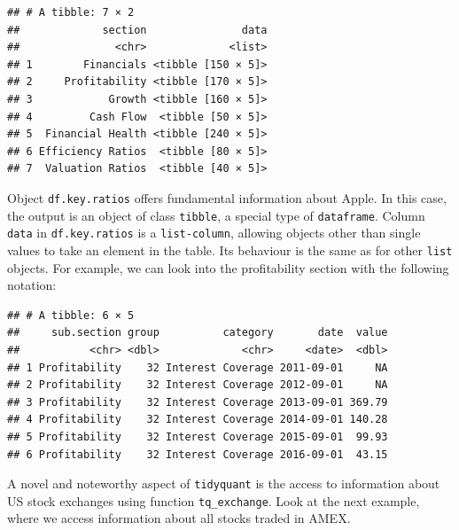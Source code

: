 \documentclass[11pt,]{book}
\newenvironment{Shaded}{\begin{snugshade}}{\end{snugshade}}
\newcommand{\KeywordTok}[1]{\textcolor[rgb]{0.27,0.27,0.27}{\textbf{#1}}}
\newcommand{\DecValTok}[1]{\textcolor[rgb]{0.06,0.06,0.06}{#1}}
\newcommand{\StringTok}[1]{\textcolor[rgb]{0.5,0.5,0.5}{#1}}
\newcommand{\CommentTok}[1]{\textcolor[rgb]{0.56,0.35,0.01}{\textit{#1}}}
\newcommand{\OperatorTok}[1]{\textcolor[rgb]{0.81,0.36,0.00}{\textbf{#1}}}
\newcommand{\NormalTok}[1]{#1}
\begin{document}
\begin{verbatim}
## # A tibble: 7 × 2
##             section               data
##               <chr>             <list>
## 1        Financials <tibble [150 × 5]>
## 2     Profitability <tibble [170 × 5]>
## 3            Growth <tibble [160 × 5]>
## 4         Cash Flow  <tibble [50 × 5]>
## 5  Financial Health <tibble [240 × 5]>
## 6 Efficiency Ratios  <tibble [80 × 5]>
## 7  Valuation Ratios  <tibble [40 × 5]>
\end{verbatim}

Object \texttt{df.key.ratios} offers fundamental information about
Apple. In this case, the output is an object of class \texttt{tibble}, a
special type of \texttt{dataframe}. Column \texttt{data} in
\texttt{df.key.ratios} is a \texttt{list-column}, allowing objects other
than single values to take an element in the table. Its behaviour is the
same as for other \texttt{list} objects. For example, we can look into
the profitability section with the following notation:

\begin{Shaded}
\end{Shaded}

\begin{verbatim}
## # A tibble: 6 × 5
##     sub.section group          category       date  value
##           <chr> <dbl>             <chr>     <date>  <dbl>
## 1 Profitability    32 Interest Coverage 2011-09-01     NA
## 2 Profitability    32 Interest Coverage 2012-09-01     NA
## 3 Profitability    32 Interest Coverage 2013-09-01 369.79
## 4 Profitability    32 Interest Coverage 2014-09-01 140.28
## 5 Profitability    32 Interest Coverage 2015-09-01  99.93
## 6 Profitability    32 Interest Coverage 2016-09-01  43.15
\end{verbatim}

A novel and noteworthy aspect of \texttt{tidyquant} is the access to
information about US stock exchanges using function
\texttt{tq\_exchange}. Look at the next example, where we access
information about all stocks traded in AMEX.
\end{document}
